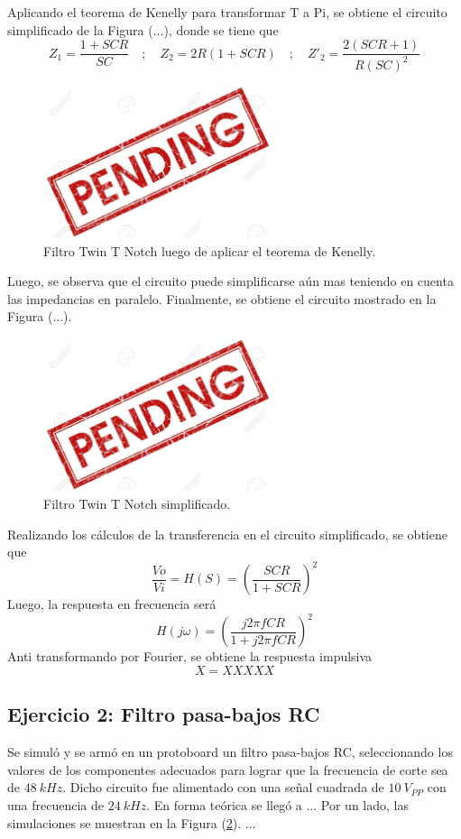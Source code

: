 \documentclass[a4paper]{article}
\begin{document}
Aplicando el teorema de Kenelly para transformar T a Pi, se obtiene el circuito simplificado de la Figura (...), donde se tiene que
\[Z_1=\frac{1+SCR}{SC}\hspace{1em};\hspace{1em} Z_2=2R(1+SCR) \hspace{1em};\hspace{1em} Z'_2=\frac{2(SCR+1)}{R(SC)^2}\]
\begin{figure}[H]
	\centering
	\includegraphics[width=0.6\textwidth]{pend.jpg}
\caption{Filtro Twin T Notch luego de aplicar el teorema de Kenelly.}
	\label{fig:simu2}
\end{figure}
Luego, se observa que el circuito puede simplificarse aún mas teniendo en cuenta las impedancias en paralelo. Finalmente, se obtiene el circuito mostrado en la Figura (...).
\begin{figure}[H]
	\centering
	\includegraphics[width=0.6\textwidth]{pend.jpg}
\caption{Filtro Twin T Notch simplificado.}
	\label{fig:simu2}
\end{figure}
Realizando los cálculos de la transferencia en el circuito simplificado, se obtiene que
\[ \frac{Vo}{Vi}=H(S)=\left( \frac{SCR}{1+SCR} \right)^2 \] 
Luego, la respuesta en frecuencia será
\[H(j\omega)=\left( \frac{j 2\pi f CR}{1+ j2\pi f CR} \right)^2 \]
Anti transformando por Fourier, se obtiene la respuesta impulsiva
\[X= XXXXX\]


\subsection{Ejercicio 2: Filtro pasa-bajos RC}
Se simuló y se armó en un protoboard un filtro pasa-bajos RC, seleccionando los valores de los componentes adecuados para lograr que la frecuencia de corte sea de $ 48 \ kHz $. Dicho circuito fue alimentado con una señal cuadrada de $ 10 \ V_{PP} $ con una frecuencia de $ 24 \ kHz $.
En forma teórica se llegó a ...
Por un lado, las simulaciones se muestran en la Figura (\ref{fig:simu2}). ...
\end{document}
